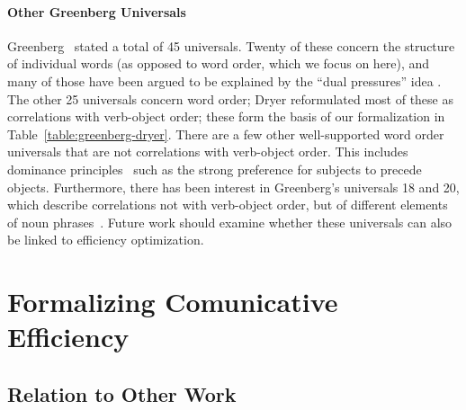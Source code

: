 \documentclass[10pt,twoside,lineno]{article}
\begin{document}


\paragraph{Other Greenberg Universals}
Greenberg~\cite{greenberg1963universals} stated a total of 45 universals.
Twenty of these concern the structure of individual words (as opposed to word order, which we focus on here), and many of those have been argued to be explained by the ``dual pressures'' idea \cite{haspelmath2006against}.
The other 25 universals concern word order; Dryer \cite{dryer1992greenbergian} reformulated most of these as correlations with verb-object order; these form the basis of our formalization in Table~\ref{table:greenberg-dryer}. %
There are a few other well-supported word order universals that are not correlations with verb-object order.
This includes dominance principles~\cite{croft2003typology} such as the strong preference for subjects to precede objects.
Furthermore, there has been interest in Greenberg's universals 18 and 20, which describe correlations not with verb-object order, but of different elements of noun phrases~\cite{cinque2005deriving, culbertson2014language, dryer2018order}.
Future work should examine whether these universals can also be linked to efficiency optimization.

\section{Formalizing Comunicative Efficiency}
\subsection{Relation to Other Work}


\end{document}
